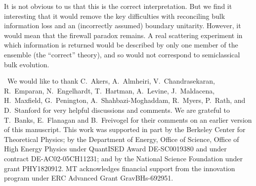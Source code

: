 \documentclass[12pt,letterpaper]{article}
\begin{document}
It is not obvious to us that this is the correct interpretation. But we find it interesting that it would remove the key difficulties with reconciling bulk information loss and an (incorrectly assumed) boundary unitarity. However, it would mean that the firewall paradox remains. A real scattering experiment in which information is returned would be described by only one member of the ensemble (the ``correct'' theory), and so would not correspond to semiclassical bulk evolution.

~We would like to thank C.~Akers, A.~Almheiri, V.~Chandra\-sekaran, R.~Emparan, N.~Engelhardt, T.~Hartman, A.~Levine, J.~Maldacena, H.~Maxfield, G.~Penington, A.~Shah\-bazi-Moghaddam, R.~Myers, P.~Rath, and D.~Stanford for very helpful discussions and comments.  We are grateful to T.~Banks, E.~Flanagan and B.~Freivogel for their comments on an earlier version of this manuscript. This work was supported in part by the Berkeley Center for Theoretical Physics; by the Department of Energy, Office of Science, Office of High Energy Physics under QuantISED Award DE-SC0019380 and under contract DE-AC02-05CH11231; and by the National Science Foundation under grant PHY1820912. MT acknowledges financial support from the innovation program under ERC Advanced Grant GravBHs-692951. 



\end{document}
